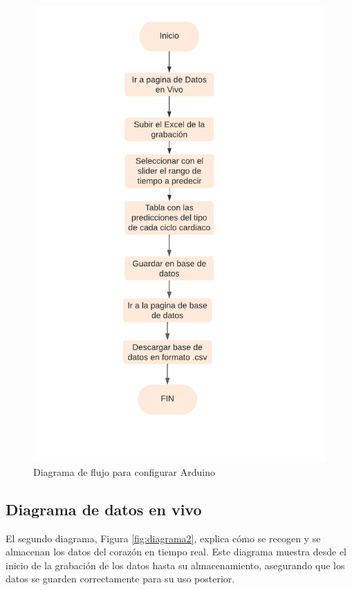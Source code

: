 \begin{figure}[h]
\centering
\includegraphics[width=\textwidth]{img/Diagramas/Diagrama_analisis.png}
\caption{Diagrama de flujo para configurar Arduino}
\label{fig:diagrama1}
\end{figure}

\subsection{Diagrama de datos en vivo}

El segundo diagrama, Figura \ref{fig:diagrama2}, explica cómo se recogen y se almacenan los datos del corazón en tiempo real. Este diagrama muestra desde el inicio de la grabación de los datos hasta su almacenamiento, asegurando que los datos se guarden correctamente para su uso posterior.

